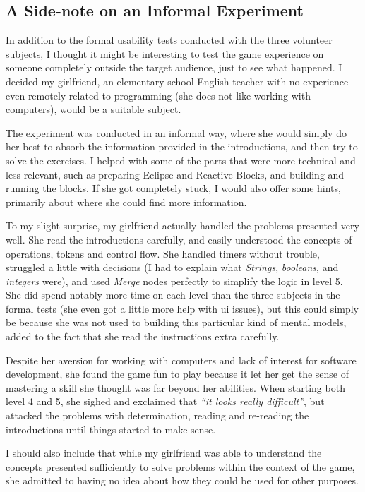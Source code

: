 \subsection{A Side-note on an Informal Experiment}
\label{sec:game_testing_sidenote}
In addition to the formal usability tests conducted with the three volunteer subjects, I thought it might be interesting to test the game experience on someone completely outside the target audience, just to see what happened. I decided my girlfriend, an elementary school English teacher with no experience even remotely related to programming (she does not like working with computers), would be a suitable subject.

\noindent
The experiment was conducted in an informal way, where she would simply do her best to absorb the information provided in the introductions, and then try to solve the exercises. I helped with some of the parts that were more technical and less relevant, such as preparing Eclipse and Reactive Blocks, and building and running the blocks. If she got completely stuck, I would also offer some hints, primarily about where she could find more information.

\noindent
To my slight surprise, my girlfriend actually handled the problems presented very well. She read the introductions carefully, and easily understood the concepts of operations, tokens and control flow. She handled timers without trouble, struggled a little with decisions (I had to explain what \emph{Strings}, \emph{booleans}, and \emph{integers} were), and used \emph{Merge} nodes perfectly to simplify the logic in level 5. She did spend notably more time on each level than the three subjects in the formal tests (she even got a little more help with \gls{ui} issues), but this could simply be because she was not used to building this particular kind of mental models, added to the fact that she read the instructions extra carefully.

\noindent
Despite her aversion for working with computers and lack of interest for software development, she found the game fun to play because it let her get the sense of mastering a skill she thought was far beyond her abilities. When starting both level 4 and 5, she sighed and exclaimed that \emph{``it looks really difficult''}, but attacked the problems with determination, reading and re-reading the introductions until things started to make sense.

\noindent
I should also include that while my girlfriend was able to understand the concepts presented sufficiently to solve problems within the context of the game, she admitted to having no idea about how they could be used for other purposes.

